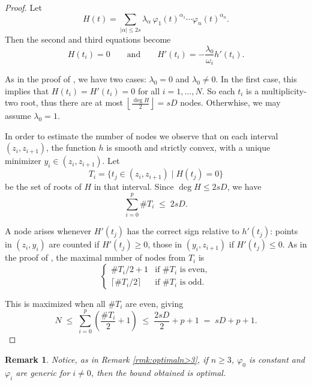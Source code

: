 \documentclass[11pt,a4paper]{amsart}
\numberwithin{equation}{section}
\newtheorem{remark}[thm]{Remark}
\theoremstyle{definition}
\numberwithin{thm}{section}
\theoremstyle{break}
\numberwithin{subcase}{case}
\begin{document}
\begin{proof}
Let
\[
H(t) = \sum_{|\alpha|\le 2s} \lambda_\alpha\,\varphi_1(t)^{\alpha_1}\dotsm \varphi_n(t)^{\alpha_n}.
\]
Then the second and third equations become
\[
H(t_i)=0 \qquad\text{and}\qquad H'(t_i)=-\frac{{\lambda_0}}{\omega_i}h'(t_i).
\]

{As in the proof of , we have two cases: $\lambda_0=0$ and $\lambda_0\neq 0$. In the first case, this implies that $H(t_i)=H'(t_i)=0$ for all $i=1,\dots,N$}. So each $t_i$ is a multiplicity-two root, thus there are at most $\left\lfloor\frac{\deg H}{2} \right\rfloor=sD$ nodes. Otherwhise, we may assume $\lambda_0=1$.

In order to estimate the number of nodes we observe that 
on each interval $(z_i,z_{i+1})$, the function $h$ is smooth and strictly convex, with a unique minimizer $y_i\in(z_i,z_{i+1})$.
Let
\[
T_i = \{t_j \in (z_i,z_{i+1}) \mid H(t_j)=0\}
\]
be the set of roots of $H$ in that interval. Since $\deg H \le 2sD$, we have
\[
\sum_{i=0}^p \#T_i \;\le\; 2sD.
\]

A node arises whenever $H'(t_j)$ has the correct sign relative to $h'(t_j)$:
points in $(z_i,y_i)$ are counted if $H'(t_j)\ge 0$, those in $(y_i,z_{i+1})$ if $H'(t_j)\le 0$.
As in the proof of , the maximal number of nodes from $T_i$ is
\[
\begin{cases}
\#T_i/2 + 1 & \text{if $\#T_i$ is even},\\[2pt]
\lceil \#T_i/2\rceil & \text{if $\#T_i$ is odd}.
\end{cases}
\]

This is maximized when all $\#T_i$ are even, giving
\[
N \;\le\; \sum_{i=0}^p \left(\frac{\#T_i}{2}+1\right)
\;\le\; \frac{2sD}{2} + p + 1
\;=\; sD + p + 1.
\]\qedhere
\end{proof}


\begin{remark}
    Notice, as in Remark \ref{rmk:optimaln>3}, if $n\geq 3$, $\varphi_0$ is constant and $\varphi_i$ are generic for $i\neq 0$, then the bound obtained is optimal.
\end{remark}
\end{document}
